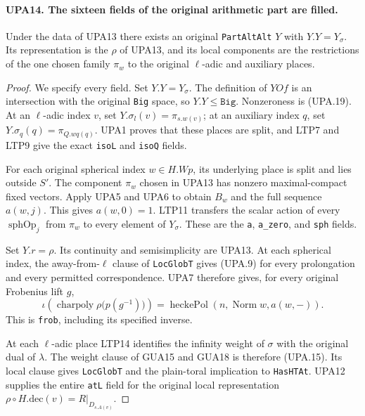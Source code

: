 \documentclass[11pt,a4paper]{article}
\numberwithin{equation}{section}
\theoremstyle{remark}\newtheorem{remark}[theorem]{Remark}
\begin{document}
\paragraph{UPA14. The sixteen fields of the original arithmetic part are filled.}
\label{claim:UPA14}
Under the data of UPA13 there exists an original
\texttt{Part\allowbreak Alt\allowbreak Alt} $Y$ with $Y.Y=Y_\sigma$.
Its representation is the $\rho$ of UPA13, and its local
components are the restrictions of the one chosen family
$\pi_w$ to the original $\ell$-adic and auxiliary places.
\begin{proof}
We specify every field.
Set $Y.Y=Y_\sigma$.  The definition of $YOf$ is an
intersection with the original \texttt{Big} space, so
$Y.Y\leq\texttt{Big}$.  Nonzeroness is (UPA.19).
At an $\ell$-adic index $v$, set
$Y.\sigma_l(v)=\pi_{s.w(v)}$; at an auxiliary index $q$,
set $Y.\sigma_q(q)=\pi_{Q.wq(q)}$.
UPA1 proves that these places are split, and
LTP7 and LTP9 give the exact
\texttt{iso\allowbreak L} and \texttt{iso\allowbreak Q} fields.

For each original spherical index $w\in H.Wp$, its
underlying place is split and lies outside $S'$.
The component $\pi_w$ chosen in UPA13 has nonzero
maximal-compact fixed vectors.  Apply UPA5 and UPA6
to obtain $B_w$ and the full sequence $a(w,j)$.
This gives $a(w,0)=1$.  LTP11
transfers the scalar action of every
$\operatorname{sphOp}_j$ from $\pi_w$ to every element
of $Y_\sigma$.  These are the \texttt{a},
\texttt{a\_\allowbreak zero}, and \texttt{sph} fields.

Set $Y.r=\rho$.  Its continuity and semisimplicity
are UPA13.  At each spherical index, the away-from-$\ell$
clause of \texttt{Loc\allowbreak Glob\allowbreak T} gives (UPA.9) for every
prolongation and every permitted correspondence.
UPA7 therefore gives, for every original Frobenius lift $g$,
\[
 \iota\!\left(\operatorname{charpoly}
                  \rho\bigl(p(g^{-1})\bigr)\right)
       =\operatorname{heckePol}(n,\operatorname{Norm}w,a(w,-)).
 \tag{UPA.20}
\]
This is \texttt{frob}, including its specified inverse.

At each $\ell$-adic place LTP14
identifies the infinity weight of $\sigma$
with the original dual of $\lambda$.  The weight clause
of GUA15 and GUA18 is therefore (UPA.15).
Its local clause gives \texttt{Loc\allowbreak Glob\allowbreak T} and the
plain-toral implication to \texttt{Has\allowbreak HTAt}.
UPA12 supplies the entire \texttt{at\allowbreak L} field for
the original local representation
$\rho\circ H.\mathrm{dec}(v)=R|_{D_{s.A(v)}}$.


\end{proof}
\end{document}
